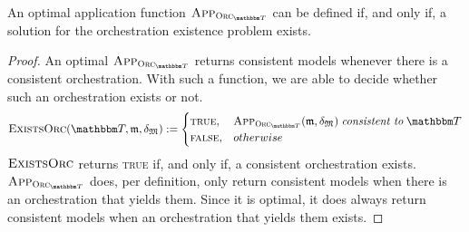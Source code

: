 \begin{theorem}
    \label{theorem:optimal_application_function_orchestration_problem}
    An optimal application function $\appfunction{\orcfunction{\transformationset{T}}}$ can be defined if, and only if, a solution for the orchestration existence problem exists.
\end{theorem}
\begin{proof}
    An optimal $\appfunction{\orcfunction{\transformationset{T}}}$ returns consistent models whenever there is a consistent orchestration.
    With such a function, we are able to decide whether such an orchestration exists or not.
    \begin{align*}
        \function{ExistsOrc}(\transformationset{T},\modeltuple{m},\changetuple{\metamodeltuple{M}}) \equalsperdefinition
            \begin{cases}
                \textsc{true}, & \appfunction{\orcfunction{\transformationset{T}}}(\modeltuple{m},\changetuple{\metamodeltuple{M}}) \consistenttomath \transformationset{T} \\
                \textsc{false}, & otherwise
            \end{cases}
    \end{align*}
    $\textsc{ExistsOrc}$ returns \textsc{true} if, and only if, a consistent orchestration exists.
    $\appfunction{\orcfunction{\transformationset{T}}}$ does, per definition, only return consistent models when there is an orchestration that yields them.
    Since it is optimal, it does always return consistent models when an orchestration that yields them exists.
\end{proof}

